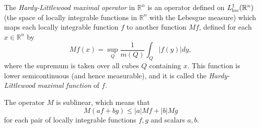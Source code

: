 \documentclass[12pt]{article}
\begin{document}
The \emph{Hardy-Littlewood maximal operator} in $\mathbb{R}^n$ is an operator defined on $L^1_{\textnormal{loc}}(\mathbb{R}^n)$ (the space of locally integrable functions in $\mathbb{R}^n$ with the Lebesgue measure) which maps each locally integrable function $f$ to another function $Mf$, defined for each $x\in \mathbb{R}^n$ by 
\[Mf(x) = \sup_Q \frac{1}{m(Q)}\int_Q |f(y)|dy,\]
where the supremum is taken over all cubes $Q$ containing $x$. 
This function is lower semicontinuous (and hence measurable), and it is called the \emph{Hardy-Littlewood maximal function} of $f$.

The operator $M$ is sublinear, which means that 
\[M(af + bg) \leq |a|Mf + |b|Mg\]
for each pair of locally integrable functions $f,g$ and scalars $a,b$.
\end{document}
